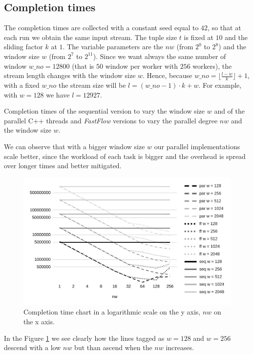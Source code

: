 \subsection{Completion times}
The completion times are collected with a constant seed equal to $42$, so that at each run we obtain the same input stream. The tuple size $t$ is fixed at $10$ and the sliding factor $k$ at $1$. The variable parameters are the $nw$ (from $2^0$ to $2^8$) and the window size $w$ (from $2^7$ to $2^{11}$). Since we want always the same number of window $w\_no = 12800$ (that is $50$ window per worker with $256$ workers), the stream length changes with the window size $w$. Hence, because $w\_no = \lfloor\frac{l-w}{k}\rfloor+1$, with a fixed $w\_no$ the stream size will be $l = (w\_no - 1) \cdot k + w$. For example, with $w = 128$ we have $l = 12927$.

\begin{table}[H]
    \centering
    
    \caption{Completion times of the sequential version to vary the window size $w$ and of the parallel C++ threads and \textit{FastFlow} versions to vary the parallel degree $nw$ and the window size $w$.}
    \label{tab:time_table}
\end{table}

\noindent
We can observe that with a bigger window size $w$ our parallel implementations scale better, since the workload of each task is bigger and the overhead is spread over longer times and better mitigated.

\begin{figure}[H]
    \centering
    \includegraphics[width=.8\linewidth]{assets/completion_time}
    \caption{Completion time chart in a logarithmic scale on the y axis, $nw$ on the x axis.}
    \label{fig:completion_time}
\end{figure}

\noindent
In the Figure \ref{fig:completion_time} we see clearly how the lines tagged as $w = 128$ and $w = 256$ descend with a low $nw$ but than ascend when the $nw$ increases.

